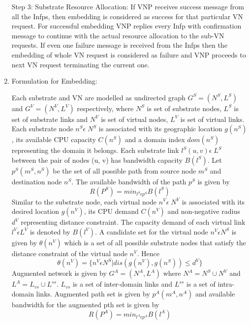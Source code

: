 \documentclass[article,dr=phil,type=msc ,colorback,accentcolor=tud4b]{tudthesis}
\begin{document}
\begin{enumerate}[label=(\Alph*)]
Step 3: Substrate Resource Allocation: If VNP receives success message from all the Infps, then embedding is considered as success for that particular VN request. For successful embedding VNP replies every Infp with confirmation message to continue with the actual resource allocation to the sub-VN requests. If even one failure message is received from the Infps then the embedding of whole VN request is considered as failure and VNP proceeds to next VN request terminating the current one.

\item Formulation for Embedding:  
 
 Each substrate and VN are modelled as undirected graph $G^{S} = (N^{S}, L^{S})$ and $G^{V} = (N^{V}, L^{V})$ respectively, where $N^{S}$ is set of substrate nodes, $L^{S}$ is set of substrate links and $N^{V}$ is set of virtual nodes, $L^{V}$ is set of virtual links. Each substrate node $n^{S} \epsilon \; N^{S}$ is associated with its geographic location $g(n^{S})$, its available CPU capacity $C(n^{S})$ and a domain index $dom(n^{S})$ representing the domain it belongs. Each substrate link $l^{S}(u, v) \epsilon \; L^{S}$ between the pair of nodes (u, v) has bandwidth capacity $B(l^{S})$. 
 Let  $p^{S}(m^{S}, n^{S})$ be the set of all possible path from source node $m^{S}$ and destination node $n^{S}$. The available bandwidth of the path $p^{S}$ is given by 
 \begin{equation}
 R(P^{S}) = min_{l^{S}\epsilon p^{S}}B(l^{S})
  \end{equation} 
Similar to the substrate node, each virtual node $n^{V} \epsilon \; N^{V}$ is associated with its desired location $g(n^{V})$, its CPU demand $C(n^{V})$ and non-negative radius $d^{V}$ representing distance constraint. The capacity demand of each virtual link $l^{V}\epsilon L^{V}$ is denoted by $B(l^{V})$. A candidate set for the virtual node $n^{V} \epsilon N^{S}$ is given by $\theta(n^{V})$ which is a set of all possible substrate nodes that satisfy the distance constraint of the virtual node $n^{V}$. Hence 
\begin{equation}
\theta(n^{V}) = \{n^{V} \epsilon N^{S} | dis(g(n^{V}), g(n^{S})) \leq d^{V}\}
\end{equation}
Augmented network is given by $G^{A} = (N^{A}, L^{A})$ where $N^{A} = N^{S} \cup N^{V}$ and $L^{A} = L_{vs} \cup L^{ss}$. $L_{vs}$ is a set of inter-domain links and $L^{ss}$ is a set of intra-domain links. Augmented path set is given by $p^{A}(m^{A}, n^{A})$ and available bandwidth for the augmented pth set is given by 
\begin{equation}
R(P^{A}) = min_{l^{A}\epsilon p^{A}}B(l^{A})
\end{equation} 

\end{enumerate}
\end{document}
